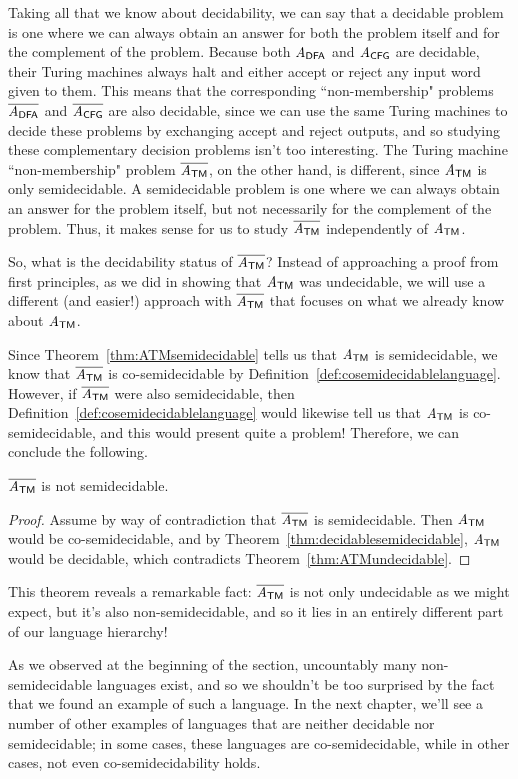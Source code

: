 Taking all that we know about decidability, we can say that a decidable problem is one where we can always obtain an answer for both the problem itself and for the complement of the problem. Because both $\mathit{A}_{\textsf{DFA}}$ and $\mathit{A}_{\textsf{CFG}}$ are decidable, their Turing machines always halt and either accept or reject any input word given to them. This means that the corresponding ``non-membership" problems $\overline{\mathit{A}_{\textsf{DFA}}}$ and $\overline{\mathit{A}_{\textsf{CFG}}}$ are also decidable, since we can use the same Turing machines to decide these problems by exchanging accept and reject outputs, and so studying these complementary decision problems isn't too interesting. The Turing machine ``non-membership" problem $\overline{\mathit{A}_{\textsf{TM}}}$, on the other hand, is different, since $\mathit{A}_{\textsf{TM}}$ is only semidecidable. A semidecidable problem is one where we can always obtain an answer for the problem itself, but not necessarily for the complement of the problem. Thus, it makes sense for us to study $\overline{\mathit{A}_{\textsf{TM}}}$ independently of $\mathit{A}_{\textsf{TM}}$.

So, what is the decidability status of $\overline{\mathit{A}_{\textsf{TM}}}$? Instead of approaching a proof from first principles, as we did in showing that $\mathit{A}_{\textsf{TM}}$ was undecidable, we will use a different (and easier!) approach with $\overline{\mathit{A}_{\textsf{TM}}}$ that focuses on what we already know about $\mathit{A}_{\textsf{TM}}$.

Since Theorem~\ref{thm:ATMsemidecidable} tells us that $\mathit{A}_{\textsf{TM}}$ is semidecidable, we know that $\overline{\mathit{A}_{\textsf{TM}}}$ is co-semidecidable by Definition~\ref{def:cosemidecidablelanguage}. However, if $\overline{\mathit{A}_{\textsf{TM}}}$ were also semidecidable, then Definition~\ref{def:cosemidecidablelanguage} would likewise tell us that $\mathit{A}_{\textsf{TM}}$ is co-semidecidable, and this would present quite a problem! Therefore, we can conclude the following.

\begin{theorem}\label{thm:coATMnotsemidecidable}
$\overline{\mathit{A}_{\textsf{TM}}}$ is not semidecidable.

\begin{proof}
Assume by way of contradiction that $\overline{\mathit{A}_{\textsf{TM}}}$ is semidecidable. Then $\mathit{A}_{\textsf{TM}}$ would be co-semidecidable, and by Theorem~\ref{thm:decidablesemidecidable}, $\mathit{A}_{\textsf{TM}}$ would be decidable, which contradicts Theorem~\ref{thm:ATMundecidable}.
\end{proof}
\end{theorem}

This theorem reveals a remarkable fact: $\overline{\mathit{A}_{\textsf{TM}}}$ is not only undecidable as we might expect, but it's also non-semidecidable, and so it lies in an entirely different part of our language hierarchy!

As we observed at the beginning of the section, uncountably many non-semidecidable languages exist, and so we shouldn't be too surprised by the fact that we found an example of such a language. In the next chapter, we'll see a number of other examples of languages that are neither decidable nor semidecidable; in some cases, these languages are co-semidecidable, while in other cases, not even co-semidecidability holds.
